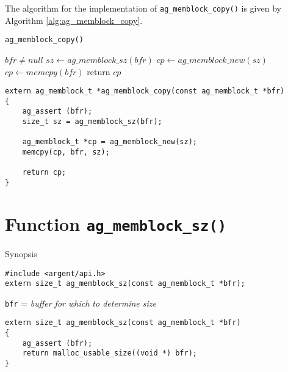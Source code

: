 The algorithm for the implementation of \verb|ag_memblock_copy()| is given by
Algorithm \ref{alg:ag_memblock_copy}.

\begin{algorithm}
\scriptsize
\caption{\texttt{ag\_memblock\_copy()}}
\label{alg:ag_memblock_copy}

\begin{algorithmic}
\Require $bfr \neq null$
\State $sz \gets ag\_memblock\_sz(bfr)$ 
\State $cp \gets ag\_memblock\_new(sz)$ 
\State $cp \gets memcpy(bfr)$ 
\State return $cp$
\EndProcedure
\end{algorithmic}

\end{algorithm}





\lstset{style=CODE}
\begin{lstlisting}[linewidth=1.0\linewidth,
    caption=Definition of ag\_memblock\_copy()]
extern ag_memblock_t *ag_memblock_copy(const ag_memblock_t *bfr)
{
    ag_assert (bfr);
    size_t sz = ag_memblock_sz(bfr);

    ag_memblock_t *cp = ag_memblock_new(sz);
    memcpy(cp, bfr, sz);

    return cp;
}
\end{lstlisting}


%


\section{Function \texttt{ag\_memblock\_sz()}}
  \begin{bclogo}[logo=\bccrayon, noborder=true, barre=snake, couleurBarre=gray]
    {Synopsis}
  \lstset{style=SYNOPSIS}
  \begin{lstlisting}[linewidth=1.0\linewidth]
#include <argent/api.h>
extern size_t ag_memblock_sz(const ag_memblock_t *bfr);
  \end{lstlisting}
  \scriptsize
  \texttt{bfr} = \emph{buffer for which to determine size}
  \end{bclogo}

\lstset{style=CODE}
\begin{lstlisting}[linewidth=1.0\linewidth,
    caption=Definition of ag\_memblock\_sz()]
extern size_t ag_memblock_sz(const ag_memblock_t *bfr)
{
    ag_assert (bfr);
    return malloc_usable_size((void *) bfr);
}
\end{lstlisting}


